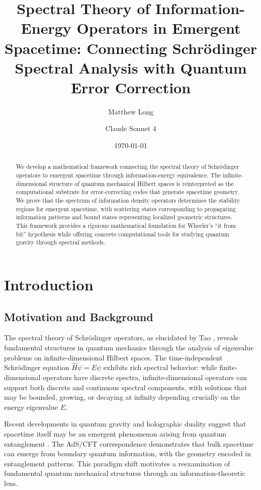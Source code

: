 \documentclass[12pt]{article}
\title{\textbf{Spectral Theory of Information-Energy Operators in Emergent Spacetime: Connecting Schrödinger Spectral Analysis with Quantum Error Correction}}
\author[1]{Matthew Long}
\author[2]{Claude Sonnet 4}
\affil[1]{Yoneda AI}
\affil[2]{Anthropic}
\date{\today}
\begin{document}
\maketitle

\begin{abstract}
We develop a mathematical framework connecting the spectral theory of Schrödinger operators to emergent spacetime through information-energy equivalence. The infinite-dimensional structure of quantum mechanical Hilbert spaces is reinterpreted as the computational substrate for error-correcting codes that generate spacetime geometry. We prove that the spectrum of information density operators determines the stability regions for emergent spacetime, with scattering states corresponding to propagating information patterns and bound states representing localized geometric structures. This framework provides a rigorous mathematical foundation for Wheeler's ``it from bit'' hypothesis while offering concrete computational tools for studying quantum gravity through spectral methods.
\end{abstract}


\onehalfspacing

\tableofcontents

\newpage

\section{Introduction}

\subsection{Motivation and Background}

The spectral theory of Schrödinger operators, as elucidated by Tao \cite{Tao2006}, reveals fundamental structures in quantum mechanics through the analysis of eigenvalue problems on infinite-dimensional Hilbert spaces. The time-independent Schrödinger equation $\hat{H}\psi = E\psi$ exhibits rich spectral behavior: while finite-dimensional operators have discrete spectra, infinite-dimensional operators can support both discrete and continuous spectral components, with solutions that may be bounded, growing, or decaying at infinity depending crucially on the energy eigenvalue $E$.

Recent developments in quantum gravity and holographic duality suggest that spacetime itself may be an emergent phenomenon arising from quantum entanglement \cite{VanRaamsdonk2010, Ryu2006}. The AdS/CFT correspondence demonstrates that bulk spacetime can emerge from boundary quantum information, with the geometry encoded in entanglement patterns. This paradigm shift motivates a reexamination of fundamental quantum mechanical structures through an information-theoretic lens.
\end{document}
